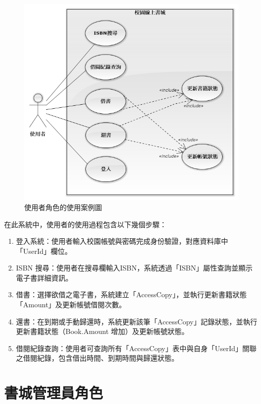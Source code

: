 \begin{figure}[ht]
    \centering
    \includegraphics[width=\linewidth]{image/使用案例：使用者.png}
    \captionsetup{justification=centering}
    \caption{使用者角色的使用案例圖}
\end{figure}

在此系統中，使用者的使用過程包含以下幾個步驟：
\begin{enumerate}
    \item 登入系統：使用者輸入校園帳號與密碼完成身份驗證，對應資料庫中「UserId」欄位。
    \item ISBN 搜尋：使用者在搜尋欄輸入ISBN，系統透過「ISBN」屬性查詢並顯示電子書詳細資訊。
    \item 借書：選擇欲借之電子書，系統建立「AccessCopy」，並執行更新書籍狀態「Amount」及更新帳號借閱次數。
    \item 還書：在到期或手動歸還時，系統更新該筆「AccessCopy」記錄狀態，並執行更新書籍狀態（Book.Amount 增加）及更新帳號狀態。
    \item 借閱紀錄查詢：使用者可查詢所有「AccessCopy」表中與自身「UserId」關聯之借閱紀錄，包含借出時間、到期時間與歸還狀態。
\end{enumerate}

\clearpage

\section{書城管理員角色}


